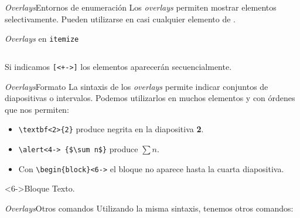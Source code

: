\begin{frame}[fragile]{\textit{Overlays}}{Entornos de enumeración}
  Los \textit{overlays} permiten mostrar elementos selectivamente.
  Pueden utilizarse en casi cualquier elemento de \beamer.

  \espacio

  \begin{exampleblock}{\textit{Overlays} en \texttt{itemize}}

  \begin{columns}
  \end{columns}
  \espacio
  Si indicamos \texttt{[<+->]} los elementos aparecerán secuencialmente.
  \end{exampleblock}
\end{frame}

\begin{frame}{\textit{Overlays}}{Formato}
  La sintaxis de los \textit{overlays} permite indicar conjuntos de diapositivas
  o intervalos. Podemos utilizarlos en muchos elementos y con órdenes que nos permiten:
    \espacio

    \begin{itemize}
      \item \texttt{\textbackslash{\color{keywords}textbf}\alert<1>{<2>}\{2\}}
      produce  negrita en la diapositiva \textbf<2>{2}.

      \item
      \texttt{\textbackslash{\color{keywords}alert}\alert<3>{<4->}%
      \{\$\textbackslash sum n\$\}}
      produce \alert<4->{$\sum n$}.

      \item Con \texttt{\textbackslash{\color{keywords}begin}\{block\}\alert<5>{<6->}} el
      bloque no aparece hasta la cuarta diapositiva.
    \end{itemize}

    \begin{block}<6->{Bloque}
      Texto.
    \end{block}
\end{frame}

\begin{frame}[fragile]{\textit{Overlays}}{Otros comandos}
  Utilizando la misma sintaxis, tenemos otros comandos:
  \espacio
\end{frame}

